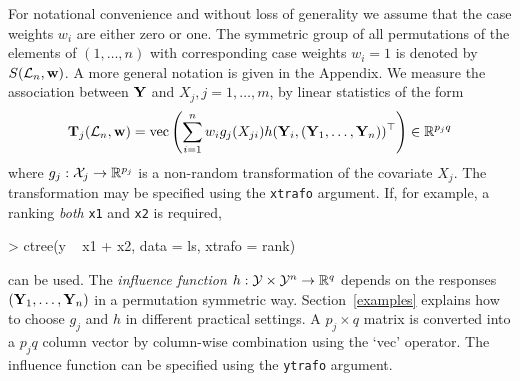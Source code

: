 \documentclass[letter]{article}
\begin{document}
For notational convenience and without loss of generality we assume that the
case weights $w_i$ are either zero or one. The symmetric group of all
permutations of  the elements of $(1, \dots, n)$ with corresponding case
weights $w_i = 1$ is denoted by $S(\mathcal{L}_n, \mathbf{w})$. A more general notation is
given in the Appendix. We measure the association between $\mathbf{Y}$ and $X_j, j = 1, \dots, m$, 
by linear statistics of the form
\begin{eqnarray} \label{linstat}
\mathbf{T}_j(\mathcal{L}_n, \mathbf{w}) = \text{vec} \left( \sum_{i=1}^n w_i g_j(X_{ji})
h(\mathbf{Y}_i, (\mathbf{Y}_1, \dots, \mathbf{Y}_n))^\top \right) \in \mathbb{R}^{p_jq}
\end{eqnarray}
where $g_j: \mathcal{X}_j \rightarrow \mathbb{R}^{p_j}$ is a non-random transformation of
the covariate $X_j$. The transformation may be specified using the
\texttt{xtrafo} argument. If, for example, a ranking \textit{both}
\texttt{x1} and \texttt{x2} is required,
\begin{Schunk}
\begin{Sinput}
> ctree(y ~ x1 + x2, data = ls, xtrafo = rank)
\end{Sinput}
\end{Schunk}
can be used. The \emph{influence function} 
$h: \mathcal{Y} \times \mathcal{Y}^n \rightarrow
\mathbb{R}^q$ depends on the responses $(\mathbf{Y}_1, \dots, \mathbf{Y}_n)$ in a permutation
symmetric way. 
Section~\ref{examples} explains how to choose $g_j$ and $h$ in different 
practical settings. A $p_j \times q$ matrix is converted into a 
$p_jq$ column vector by column-wise combination using the `vec' operator. 
The influence function can be specified using the \texttt{ytrafo} argument.
\end{document}
